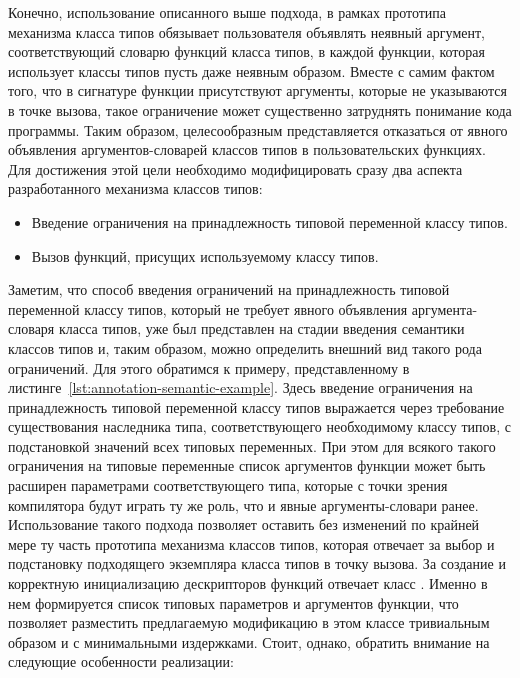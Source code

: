 Конечно, использование описанного выше подхода, в рамках прототипа механизма класса типов обязывает пользователя объявлять неявный аргумент, соответствующий словарю функций класса типов, в каждой функции, которая использует классы типов пусть даже неявным образом. Вместе с самим фактом того, что в сигнатуре функции присутствуют аргументы, которые не указываются в точке вызова, такое ограничение может существенно затруднять понимание кода программы. Таким образом, целесообразным представляется отказаться от явного объявления аргументов-словарей классов типов в пользовательских функциях. Для достижения этой цели необходимо модифицировать сразу два аспекта разработанного механизма классов типов:
\begin{itemize}
    \item Введение ограничения на принадлежность типовой переменной классу типов. 
    \item Вызов функций, присущих используемому классу типов. 
\end{itemize}
Заметим, что способ введения ограничений на принадлежность типовой переменной классу типов, который не требует явного объявления аргумента-словаря класса типов, уже был представлен на стадии введения семантики классов типов и, таким образом, можно определить внешний вид такого рода ограничений. Для этого обратимся к примеру, представленному в листинге~\ref{lst:annotation-semantic-example}. Здесь введение ограничения на принадлежность типовой переменной классу типов выражается через требование существования наследника типа, соответствующего необходимому классу типов, с подстановкой значений всех типовых переменных. При этом для всякого такого ограничения на типовые переменные список аргументов функции может быть расширен параметрами соответствующего типа, которые с точки зрения компилятора будут играть ту же роль, что и явные аргументы-словари ранее. Использование такого подхода позволяет оставить без изменений по крайней мере ту часть прототипа механизма классов типов, которая отвечает за выбор и подстановку подходящего экземпляра класса типов в точку вызова. За создание и корректную инициализацию дескрипторов функций отвечает класс . Именно в нем формируется список типовых параметров и аргументов функции, что позволяет разместить предлагаемую модификацию в этом классе тривиальным образом и с минимальными издержками. Стоит, однако, обратить внимание на следующие особенности реализации:
